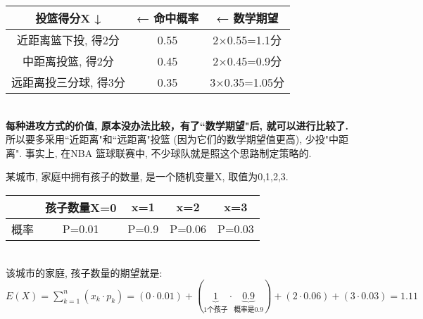 \documentclass[UTF8]{ctexart}
\begin{document}
	
	\begin{myEnvSample}
\begin{tabular}{|c|c|c|}
	\hline
	投篮得分X ↓ & ← 命中概率 & ← 数学期望 \\
	\hline
	近距离篮下投, 得2分 & 0.55 & 2×0.55=1.1分 \\
	\hline
	中距离投篮, 得2分 & 0.45 & 2×0.45=0.9分 \\
	\hline
	远距离投三分球, 得3分 & 0.35 & 3×0.35=1.05分 \\
	\hline
\end{tabular} \\

\textbf{每种进攻方式的价值, 原本没办法比较，有了``数学期望"后, 就可以进行比较了.} 所以要多采用``近距离"和``远距离"投篮 (因为它们的数学期望值更高), 少投"中距离". 事实上, 在NBA 篮球联赛中, 不少球队就是照这个思路制定策略的.
	\end{myEnvSample}
	\vspace{1em} 
	
	
	
	
	
	\begin{myEnvSample}
		某城市, 家庭中拥有孩子的数量, 是一个随机变量X, 取值为0,1,2,3. \\
		\begin{tabular}{|c|c|c|c|c|}
			\hline
			& 孩子数量X=0 & x=1 & x=2 & x=3 \\
			\hline
			概率 & P=0.01 & P=0.9 & P=0.06 & P=0.03 \\
			\hline
		\end{tabular} \\
	
	该城市的家庭, 孩子数量的期望就是: \\
$E(X)=\sum_{k=1}^n{(x_k\cdot p_k)}=(0\cdot 0.01)+(\underset{1\text{个孩子}}{\underbrace{1}}\cdot \underset{\text{概率是}0.9}{\underbrace{0.9}})+(2\cdot 0.06)+(3\cdot 0.03)=1.11$ 	
	\end{myEnvSample}
	\vspace{1em} 
	
	
	
\end{document}
